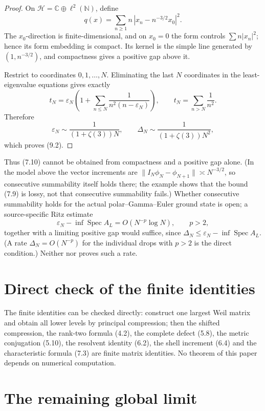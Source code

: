 \documentclass[11pt]{amsart}
\theoremstyle{definition}
\theoremstyle{remark}
\newcommand{\C}{\mathbb C}
\newcommand{\Spec}{\operatorname{Spec}}
\newcommand{\eps}{\varepsilon}
\begin{document}
\begin{proof}
On \(\mathcal H=\C\oplus\ell^2(\mathbb N)\), define
\[
 q(x)=\sum_{n\ge1}n\,|x_n-n^{-3/2}x_0|^2.
\tag{9.3}
\]
The \(x_0\)-direction is finite-dimensional, and on \(x_0=0\) the form
controls \(\sum n|x_n|^2\); hence its form embedding is compact.  Its kernel
is the simple line generated by \((1,n^{-3/2})\), and compactness gives a
positive gap above it.

Restrict to coordinates \(0,1,\ldots,N\).  Eliminating the last \(N\)
coordinates in the least-eigenvalue equations gives exactly
\[
 t_N=\eps_N\left(1+\sum_{n\le N}\frac{1}{n^2(n-\eps_N)}\right),
 \qquad t_N=\sum_{n>N}\frac{1}{n^2}.
\tag{9.4}
\]
Therefore
\[
 \eps_N\sim\frac{1}{(1+\zeta(3))N},
 \qquad
 \Delta_N\sim\frac{1}{(1+\zeta(3))N^2},
\tag{9.5}
\]
which proves (9.2).
\end{proof}

Thus (7.10) cannot be obtained from compactness and a positive gap alone.
(In the model above the vector increments are
\(\|I_N\phi_N-\phi_{N+1}\|\asymp N^{-3/2}\), so consecutive summability itself
holds there; the example shows that the bound (7.9) is lossy, not that
consecutive summability fails.)  Whether consecutive summability holds for the
actual polar--Gamma--Euler ground state is open; a source-specific
Ritz estimate
\[
 \eps_N-\inf\Spec A_L=O(N^{-p}\log N),\qquad p>2,
\tag{9.6}
\]
together with a limiting positive gap would suffice, since
\(\Delta_N\le\eps_N-\inf\Spec A_L\).  (A rate \(\Delta_N=O(N^{-p})\) for the
individual drops with \(p>2\) is the direct condition.)  Neither \cite{CCM}
nor \cite{Suzuki} proves such a rate.

\section{Direct check of the finite identities}

The finite identities can be checked directly: construct one largest Weil
matrix and obtain all lower levels by principal compression; then the
shifted compression, the rank-two formula (4.2), the complete defect (5.8),
the metric conjugation (5.10), the resolvent identity (6.2), the shell
increment (6.4) and the characteristic formula (7.3) are finite matrix
identities.  No theorem of this paper depends on numerical computation.

\section{The remaining global limit}
\label{sec:global}
\end{document}
